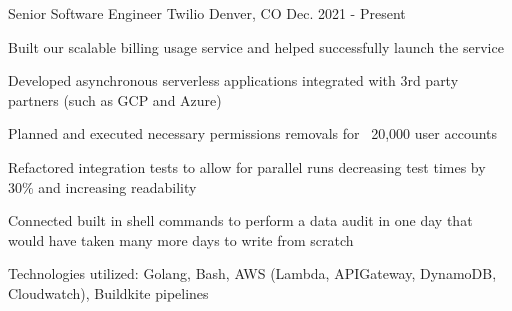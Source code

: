 


\begin{cventries}

\vspace{-.25em}
\cventry
{Senior Software Engineer} %
{Twilio} %
{Denver, CO} %
{Dec. 2021 - Present} %
{ %
\begin{cvitems}
    \item {Built our scalable billing usage service and helped successfully launch the service}
    \item {Developed asynchronous serverless applications integrated with 3rd party partners (such as GCP and Azure)}
    \item {Planned and executed necessary permissions removals for ~20,000 user accounts}
    \item {Refactored integration tests to allow for parallel runs decreasing test times by 30\% and increasing readability}
    \item {Connected built in shell commands to perform a data audit in one day that would have taken many more days to write from scratch}
    \item {Technologies utilized: Golang, Bash, AWS (Lambda, APIGateway, DynamoDB, Cloudwatch), Buildkite pipelines}
\end{cvitems}
}


\end{cventries}
